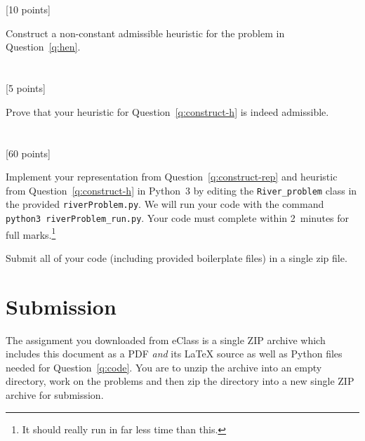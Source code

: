 \documentclass[10pt]{article}
\newcommand{\nin}{\noindent}
\newcommand{\tcv}[1]{\textcolor{m4}{#1}}
\newcounter{totalpoints}
\newcommand{\points}[1]{{\addtocounter{totalpoints}{#1}\tcv{[#1 points]}}}
\begin{document}
\section{} \points{10} \label{q:construct-h}
Construct a non-constant admissible heuristic for the problem in Question~\ref{q:hen}.

\begin{answer}{2in}
\end{answer}


\section{} \points{5}
Prove that your heuristic for Question~\ref{q:construct-h} is indeed admissible.

\begin{answer}{2in}
\end{answer}

\clearpage
\section{} \points{60} \label{q:code}
Implement your representation from Question~\ref{q:construct-rep} and heuristic from Question~\ref{q:construct-h} in Python~3 by editing the \verb|River_problem| class in the provided \texttt{riverProblem.py}.
We will run your code with the command \verb|python3 riverProblem_run.py|.
Your code must complete within 2~minutes for full marks.\footnote{It should really run in far less time than this.}

\medskip

\nin Submit all of your code (including provided boilerplate files) in a single zip file.

\vspace{2cm}


\section*{Submission}

The assignment you downloaded from eClass is a single ZIP archive which includes this document as a PDF {\em and} its \LaTeX{} source as well as Python files needed for Question~\ref{q:code}.
%
You are to unzip the archive into an empty directory, work on the problems and then zip the directory into a new single ZIP archive for submission.
\end{document}
